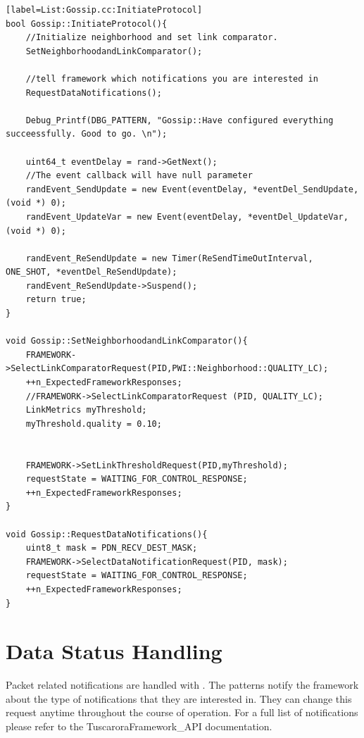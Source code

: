 \begin{lstlisting}[style=boralargefile][label=List:Gossip.cc:InitiateProtocol]
bool Gossip::InitiateProtocol(){
	//Initialize neighborhood and set link comparator.
	SetNeighborhoodandLinkComparator();

	//tell framework which notifications you are interested in
	RequestDataNotifications();

	Debug_Printf(DBG_PATTERN, "Gossip::Have configured everything succeessfully. Good to go. \n");

	uint64_t eventDelay = rand->GetNext();
	//The event callback will have null parameter
	randEvent_SendUpdate = new Event(eventDelay, *eventDel_SendUpdate, (void *) 0);
	randEvent_UpdateVar = new Event(eventDelay, *eventDel_UpdateVar, (void *) 0);

	randEvent_ReSendUpdate = new Timer(ReSendTimeOutInterval, ONE_SHOT, *eventDel_ReSendUpdate);
	randEvent_ReSendUpdate->Suspend();
	return true;
}

void Gossip::SetNeighborhoodandLinkComparator(){
	FRAMEWORK->SelectLinkComparatorRequest(PID,PWI::Neighborhood::QUALITY_LC);
	++n_ExpectedFrameworkResponses;
	//FRAMEWORK->SelectLinkComparatorRequest (PID, QUALITY_LC);
	LinkMetrics myThreshold;
	myThreshold.quality = 0.10;


	FRAMEWORK->SetLinkThresholdRequest(PID,myThreshold);
	requestState = WAITING_FOR_CONTROL_RESPONSE;
	++n_ExpectedFrameworkResponses;
}

void Gossip::RequestDataNotifications(){
	uint8_t mask = PDN_RECV_DEST_MASK;
	FRAMEWORK->SelectDataNotificationRequest(PID, mask);
	requestState = WAITING_FOR_CONTROL_RESPONSE;
	++n_ExpectedFrameworkResponses;
}
\end{lstlisting}


\section {Data Status Handling} \label{sec:DataNotificationEvent}

Packet related notifications are handled with . 
The patterns notify the framework about the type of notifications that they are interested in. They can change this request anytime throughout the course of operation. For a full list of notifications please refer to the TuscaroraFramework\_API documentation.

